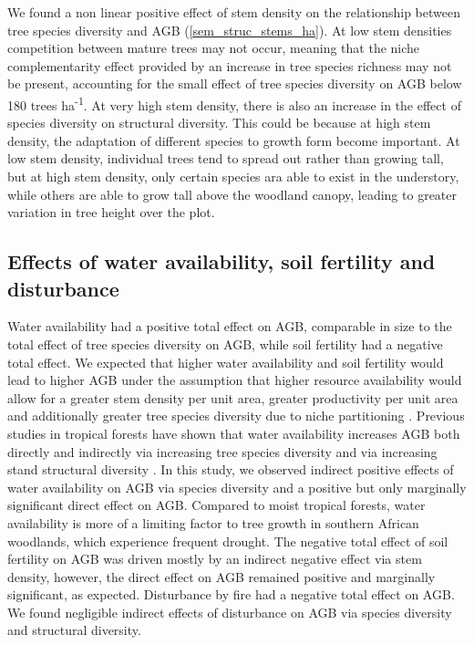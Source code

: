 \documentclass[11pt,a4paper]{article}
\newcommand{\textapprox}{\raisebox{0.5ex}{\texttildelow}}  %
\begin{document}
We found a non linear positive effect of stem density on the relationship between tree species diversity and AGB (\autoref{sem_struc_stems_ha}). At low stem densities competition between mature trees may not occur, meaning that the niche complementarity effect provided by an increase in tree species richness may not be present, accounting for the small effect of tree species diversity on AGB below \textapprox{}180 trees ha\textsuperscript{-1}. At very high stem density, there is also an increase in the effect of species diversity on structural diversity. This could be because at high stem density, the adaptation of different species to growth form become important. At low stem density, individual trees tend to spread out rather than growing tall, but at high stem density, only certain species ara able to exist in the understory, while others are able to grow tall above the woodland canopy, leading to greater variation in tree height over the plot.

\subsection{Effects of water availability, soil fertility and disturbance}

Water availability had a positive total effect on AGB, comparable in size to the total effect of tree species diversity on AGB, while soil fertility had a negative total effect. We expected that higher water availability and soil fertility would lead to higher AGB under the assumption that higher resource availability would allow for a greater stem density per unit area, greater productivity per unit area and additionally greater tree species diversity due to niche partitioning \citep{Kraaij2006, Shirima2015}. Previous studies in tropical forests have shown that water availability increases AGB both directly and indirectly via increasing tree species diversity and via increasing stand structural diversity \citep{Ali2019a, Ali2019b, Poorter2017}. In this study, we observed indirect positive effects of water availability on AGB via species diversity and a positive but only marginally significant direct effect on AGB. Compared to moist tropical forests, water availability is more of a limiting factor to tree growth in southern African woodlands, which experience frequent drought. The negative total effect of soil fertility on AGB was driven mostly by an indirect negative effect via stem density, however, the direct effect on AGB remained positive and marginally significant, as expected. Disturbance by fire had a negative total effect on AGB. We found negligible indirect effects of disturbance on AGB via species diversity and structural diversity. 
\end{document}
